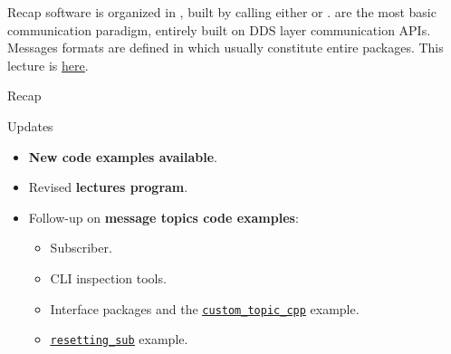 
\begin{frame}{Recap}
 software is organized in , built by  calling either  or .
\newline\newline
{} are the most basic communication paradigm, entirely built on DDS layer communication APIs.
\newline\newline
Messages formats are defined in  which usually constitute entire packages.
\newline\newline
This lecture is \href{https://github.com/robmasocco/DAFN23_Robotics_3}{\color{blue}\underline{here}}.
\end{frame}
\begin{frame}{Recap}
  \begin{block}{Updates}
    \begin{itemize}
      \item \textbf{New code examples available}.
      \item Revised \textbf{lectures program}.
      \item Follow-up on \textbf{message topics code examples}:
      \begin{itemize}
        \item Subscriber.
        \item CLI inspection tools.
        \item Interface packages and the \href{https://github.com/IntelligentSystemsLabUTV/ros2-examples/tree/humble/src/cpp/custom_topic_cpp}{\color{blue}\underline{\texttt{custom\_topic\_cpp}}} example.
        \item \href{https://github.com/IntelligentSystemsLabUTV/ros2-examples/blob/humble/src/cpp/topic_pubsub_cpp/src/resetting_sub.cpp}{\color{blue}\underline{\texttt{resetting\_sub}}} example.
      \end{itemize}
    \end{itemize}
  \end{block}
\end{frame}
